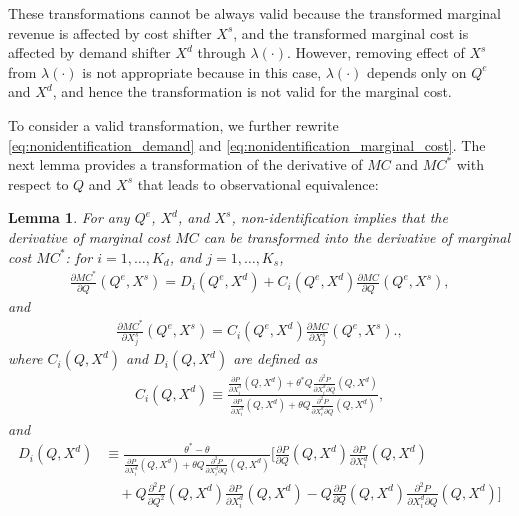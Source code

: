 \documentclass[11pt, a4paper]{article}
\newtheorem{lemma}{Lemma}
\theoremstyle{remark}
\begin{document}
These transformations cannot be always valid because the transformed marginal revenue is affected by cost shifter $X^{s}$, and the transformed marginal cost is affected by demand shifter $X^{d}$ through $\lambda(\cdot)$.
However, removing effect of $X^{s}$ from $\lambda(\cdot)$ is not appropriate because in this case, $\lambda(\cdot)$ depends only on $Q^e$ and $X^{d}$, and hence the transformation is not valid for the marginal cost.

To consider a valid transformation, we further rewrite \eqref{eq:nonidentification_demand} and \eqref{eq:nonidentification_marginal_cost}.
The next lemma provides a transformation of the derivative of $MC$ and $MC^{*}$ with respect to $Q$ and $X^{s}$ that leads to observational equivalence:
\begin{lemma}\label{lemma:mc_transformation}
    For any $Q^e$, $X^{d}$, and $X^{s}$, non-identification implies that the derivative of marginal cost $MC$ can be transformed into the derivative of marginal cost $MC^{*}$: for $i = 1, \ldots, K_d$, and $j = 1, \ldots, K_s$,
    \begin{align}
        \frac{\partial MC^{*}}{\partial Q}(Q^e, X^{s}) =D_i(Q^e, X^{d}) + C_i(Q^e, X^{d})\frac{\partial MC}{\partial Q}(Q^e, X^{s}),\label{eq:mc_transformation_quantity}
    \end{align}
    and
    \begin{align}
        \frac{\partial MC^{*}}{\partial X^{s}_j}(Q^e, X^{s}) = C_i(Q^e, X^{d})\frac{\partial MC}{\partial X^{s}_j}(Q^e, X^{s}).\label{eq:mc_transformation_cost_shifter},
    \end{align}
    where $C_i(Q, X^{d})$ and $D_i(Q, X^{d})$ are defined as
    \begin{align}
        C_i(Q, X^{d}) \equiv \frac{\frac{\partial P}{\partial X^{d}_i}(Q, X^{d}) + \theta^{*} Q\frac{\partial^2 P}{\partial X^{d}_{i}\partial Q}(Q, X^{d}) }{\frac{\partial P}{\partial X^{d}_i}(Q, X^{d}) + \theta Q\frac{\partial^2 P}{\partial X^{d}_{i}\partial Q}(Q, X^{d}) },\label{eq:ratio_marginal_revenue}
    \end{align}
    and
    \begin{align}
        D_i(Q, X^{d}) & \equiv\frac{\theta^{*} - \theta}{\frac{\partial P}{\partial X^{d}_i}(Q, X^{d}) + \theta Q\frac{\partial^2 P}{\partial X^{d}_{i}\partial Q}(Q, X^{d})}\Bigg[\frac{\partial P}{\partial Q}(Q, X^{d}) \frac{\partial P}{\partial X^{d}_i}(Q, X^{d})\\
        &\quad + Q\frac{\partial^2 P}{\partial Q^2}(Q, X^{d}) \frac{\partial P}{\partial X^{d}_i}(Q, X^{d}) - Q \frac{\partial P}{\partial Q}(Q, X^{d}) \frac{\partial^2 P}{\partial X^{d}_i\partial Q}(Q, X^{d}) \Bigg]\label{eq:intercation_derivative_demand}
    \end{align}
\end{lemma}
\end{document}
